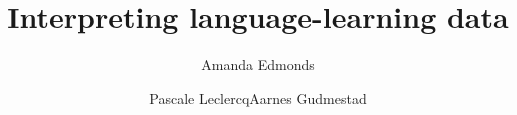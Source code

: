 \title{Interpreting language-\newlineCover learning data}
\author{Amanda Edmonds\and Pascale Leclercq\lastand Aarnes Gudmestad}
\renewcommand{\lsSeries}{eurosla}%
\renewcommand{\lsSeriesNumber}{}

\renewcommand{\lsID}{278}
